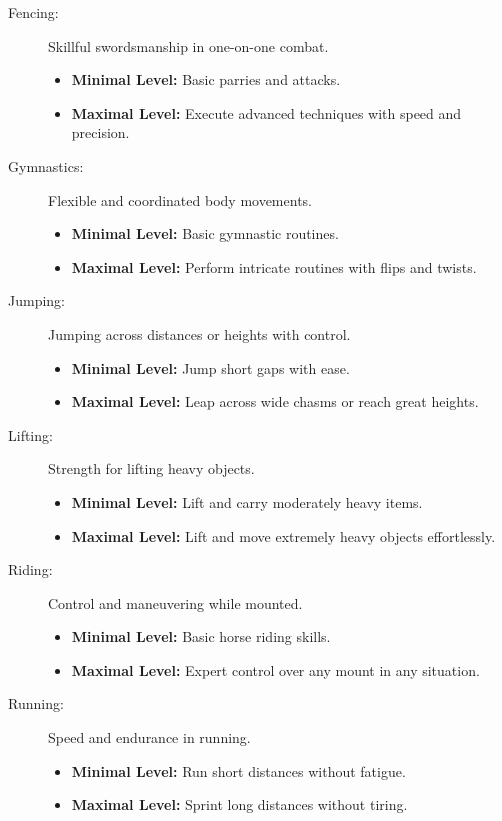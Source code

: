 \documentclass[12pt]{book}
\begin{document}
\begin{description}
    \item[Fencing:] Skillful swordsmanship in one-on-one combat.
        \begin{itemize}
            \item \textbf{Minimal Level:} Basic parries and attacks.
            \item \textbf{Maximal Level:} Execute advanced techniques with speed and precision.
        \end{itemize}

    \item[Gymnastics:] Flexible and coordinated body movements.
        \begin{itemize}
            \item \textbf{Minimal Level:} Basic gymnastic routines.
            \item \textbf{Maximal Level:} Perform intricate routines with flips and twists.
        \end{itemize}

    \item[Jumping:] Jumping across distances or heights with control.
        \begin{itemize}
            \item \textbf{Minimal Level:} Jump short gaps with ease.
            \item \textbf{Maximal Level:} Leap across wide chasms or reach great heights.
        \end{itemize}

    \item[Lifting:] Strength for lifting heavy objects.
        \begin{itemize}
            \item \textbf{Minimal Level:} Lift and carry moderately heavy items.
            \item \textbf{Maximal Level:} Lift and move extremely heavy objects effortlessly.
        \end{itemize}

    \item[Riding:] Control and maneuvering while mounted.
        \begin{itemize}
            \item \textbf{Minimal Level:} Basic horse riding skills.
            \item \textbf{Maximal Level:} Expert control over any mount in any situation.
        \end{itemize}

    \item[Running:] Speed and endurance in running.
        \begin{itemize}
            \item \textbf{Minimal Level:} Run short distances without fatigue.
            \item \textbf{Maximal Level:} Sprint long distances without tiring.
        \end{itemize}


\end{description}
\end{document}
